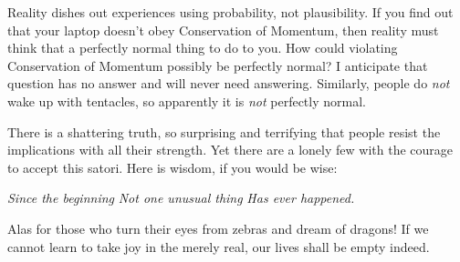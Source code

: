 {
 Reality dishes out experiences using probability, not
plausibility. If you find out that your laptop doesn't
obey Conservation of Momentum, then reality must think that a perfectly
normal thing to do to you. How could violating Conservation of Momentum
possibly be perfectly normal? I anticipate that question has no answer
and will never need answering. Similarly, people do \textit{not} wake
up with tentacles, so apparently it is \textit{not} perfectly normal.}

{
 There is a shattering truth, so surprising and terrifying that
people resist the implications with all their strength. Yet there are a
lonely few with the courage to accept this satori. Here is wisdom, if
you would be wise:}

{
 \textit{Since the beginning}\newline
 \textit{Not one unusual thing}\newline
 \textit{Has ever happened.}}

{
 Alas for those who turn their eyes from zebras and dream of
dragons! If we cannot learn to take joy in the merely real, our lives
shall be empty indeed.}

\myendsectiontext


\bigskip



